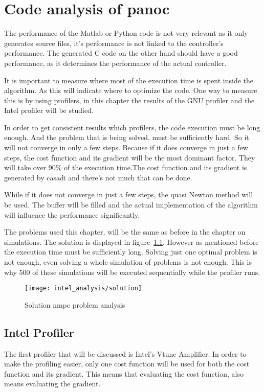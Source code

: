 \chapter{Code analysis of panoc}
The performance of the Matlab or Python code is not very relevant as it only generates source files, it's performance is not linked to the controller's performance. The generated C code on the other hand should have a good performance, as it determines the performance of the actual controller.

It is important to measure where most of the execution time is spent inside the algorithm. As this will indicate where to optimize the code. One way to measure this is by using profilers, in this chapter the results of the GNU profiler and the Intel profiler will be studied.

In order to get consistent results which profilers, the code execution must be long enough. And the problem that is being solved, must be sufficiently hard. So it will not converge in only a few steps. Because if it does converge in just a few steps, the cost function and its gradient will be the most dominant factor. They will take over 90\% of the execution time.The cost function and its gradient is generated by casadi and there's not much that can be done.

While if it does not converge in just a few steps, the quasi Newton method will be used. The buffer will be filled and the actual implementation of the algorithm will influence the performance significantly.

The problems used this chapter, will be the same as before in the chapter on simulations. The solution is displayed in figure~\ref{fig:solution nmpc problem analysis}. However as mentioned before the execution time must be sufficiently long. Solving just one optimal problem is not enough, even solving a whole simulation of problems is not enough. This is why 500 of these simulations will be executed sequentially while the profiler runs.

\begin{figure}[H]
	\centering
	\texttt{[image: intel\_analysis/solution]}
	\caption{Solution nmpc problem analysis}
	\label{fig:solution nmpc problem analysis}
\end{figure}

\section{Intel Profiler}
The first profiler that will be discussed is Intel's Vtune Amplifier. In order to make the profiling easier, only one cost function will be used for both the cost function and its gradient. This means that evaluating the cost function, also means evaluating the gradient.

